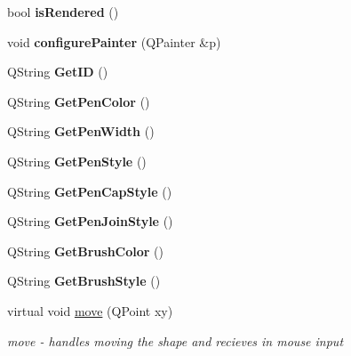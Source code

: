 \begin{DoxyCompactItemize}
\item 
\mbox{\label{class_shape_a219c9f9c30588dd10462d7c0a634fad3}} 
bool {\bfseries is\+Rendered} ()
\item 
\mbox{\label{class_shape_a41fd467475c084321064a35e1fdd983f}} 
void {\bfseries configure\+Painter} (Q\+Painter \&p)
\item 
\mbox{\label{class_shape_ab94f8b25d05839c7227c6deddcc48b9f}} 
Q\+String {\bfseries Get\+ID} ()
\item 
\mbox{\label{class_shape_a9bbe42c30c0393922840703a97016f88}} 
Q\+String {\bfseries Get\+Pen\+Color} ()
\item 
\mbox{\label{class_shape_a936495776867dbfdd5eb7575a13c844d}} 
Q\+String {\bfseries Get\+Pen\+Width} ()
\item 
\mbox{\label{class_shape_af533bf51d240c2015123b3ea37e21464}} 
Q\+String {\bfseries Get\+Pen\+Style} ()
\item 
\mbox{\label{class_shape_a7273d75f1aa60eab01ee49830ccc4c81}} 
Q\+String {\bfseries Get\+Pen\+Cap\+Style} ()
\item 
\mbox{\label{class_shape_a3850dedfd2b83302510ba817209ab40f}} 
Q\+String {\bfseries Get\+Pen\+Join\+Style} ()
\item 
\mbox{\label{class_shape_ace50307bf23aa364eab8f52531a9d35d}} 
Q\+String {\bfseries Get\+Brush\+Color} ()
\item 
\mbox{\label{class_shape_a9ff424ba6bc200c826be8a71e6d2727b}} 
Q\+String {\bfseries Get\+Brush\+Style} ()
\item 
virtual void \hyperlink{class_shape_a26d57a0589b0fd7ff03a4b5ad8dc530a}{move} (Q\+Point xy)
\begin{DoxyCompactList}\small\item\em move -\/ handles moving the shape and recieves in mouse input \end{DoxyCompactList}\item 
\mbox{\label{class_shape_aff9e910aba74bd21a349d358b4aec86a}} 

\end{DoxyCompactItemize}
